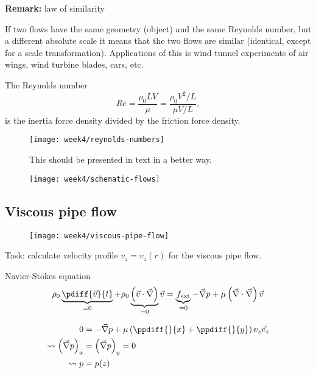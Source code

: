 \begin{framed}
\textbf{Remark:} law of similarity

If two flows have the same geometry (object) and the same Reynolds number, but a different absolute scale it means that the two flows are similar (identical, except for a scale transformation). Applications of this is wind tunnel experiments of air wings, wind turbine blades, cars, etc.
\end{framed}

The Reynolds number
\begin{equation}
Re = \frac{\rho_0 L V}{\mu} = \frac{\rho_0 V^2/L}{\mu V/L},
\end{equation}
is the inertia force density divided by the friction force density.

\begin{figure}[p]
    \centering
    \texttt{[image: week4/reynolds-numbers]}\\
    \caption{This should be presented in text in a better way.}
    \label{fig:reynolds-numbers}
\end{figure}

\begin{figure}[p]
    \centering
    \texttt{[image: week4/schematic-flows]}\\
    \caption{}
    \label{fig:schematic-flows}
\end{figure}


\newpage
\subsection{Viscous pipe flow}

\begin{figure}[ht]
    \centering
    \texttt{[image: week4/viscous-pipe-flow]}\\
    \caption{}
    \label{fig:viscous-pipe-flow}
\end{figure}

Task: calculate velocity profile $v_z=v_z(r)$ for the viscous pipe flow.

Navier-Stokes equation
\begin{equation}
\rho_0\underbrace{\pdiff{\vec{v}}{t}}_{=0}+\rho_0\underbrace{\left(\vec{v}\cdot\vec{\nabla}\right)}_{=0}\vec{v} = \underbrace{f_\mathrm{ext}}_{=0}-\vec{\nabla}p+\mu\left(\vec{\nabla}\cdot\vec{\nabla}\right)\vec{v}
\end{equation}

\begin{align}
0 &= -\vec{\nabla}p + \mu\left(\ppdiff{}{x}+\ppdiff{}{y}\right)v_z\vec{e}_z\\
\leadsto
\left(\vec{\nabla}p\right)_x &= \left(\vec{\nabla}p\right)_y = 0 \\
\leadsto
p &= p(z)
\end{align}

